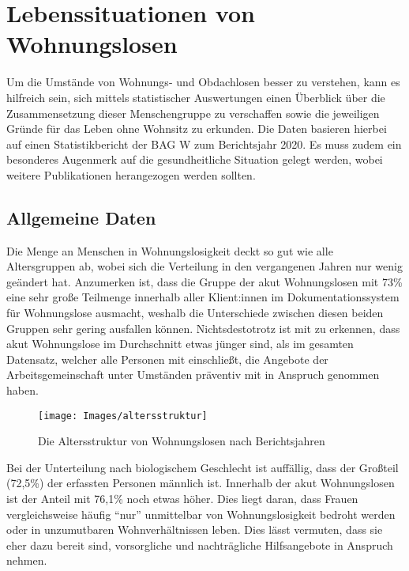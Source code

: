 \section{Lebenssituationen von Wohnungslosen}

Um die Umstände von Wohnungs- und Obdachlosen besser zu verstehen, kann es hilfreich sein, sich mittels statistischer Auswertungen einen Überblick über die Zusammensetzung dieser Menschengruppe zu verschaffen sowie die jeweiligen Gründe für das Leben ohne Wohnsitz zu erkunden. Die Daten basieren hierbei auf einen Statistikbericht der \ac{BAG W} zum Berichtsjahr 2020. Es muss zudem ein besonderes Augenmerk auf die gesundheitliche Situation gelegt werden, wobei weitere Publikationen herangezogen werden sollten.

\subsection{Allgemeine Daten}

Die Menge an Menschen in Wohnungslosigkeit deckt so gut wie alle Altersgruppen ab, wobei sich die Verteilung in den vergangenen Jahren nur wenig geändert hat. Anzumerken ist, dass die Gruppe der akut Wohnungslosen mit 73\% eine sehr große Teilmenge innerhalb aller Klient:innen im Dokumentationssystem für Wohnungslose ausmacht, weshalb die Unterschiede zwischen diesen beiden Gruppen sehr gering ausfallen können. Nichtsdestotrotz ist mit zu erkennen, dass akut Wohnungslose im Durchschnitt etwas jünger sind, als im gesamten Datensatz, welcher alle Personen mit einschließt, die Angebote der Arbeitsgemeinschaft unter Umständen präventiv mit in Anspruch genommen haben.

\begin{figure}[h]
	\centering
	\texttt{[image: Images/altersstruktur]}
	\caption[Altersstruktur von Wohnungslosen]{Die Altersstruktur von Wohnungslosen nach Berichtsjahren \citep{BAGW.2022}}
	\label{fig:altersstruktur}
\end{figure}

Bei der Unterteilung nach biologischem Geschlecht ist auffällig, dass der Großteil (72,5\%) der erfassten Personen männlich ist. Innerhalb der akut Wohnungslosen ist der Anteil mit 76,1\% noch etwas höher. Dies liegt daran, dass Frauen vergleichsweise häufig \enquote{nur} unmittelbar von Wohnungslosigkeit bedroht werden oder in unzumutbaren Wohnverhältnissen leben. Dies lässt vermuten, dass sie eher dazu bereit sind, vorsorgliche und nachträgliche Hilfsangebote in Anspruch nehmen.

